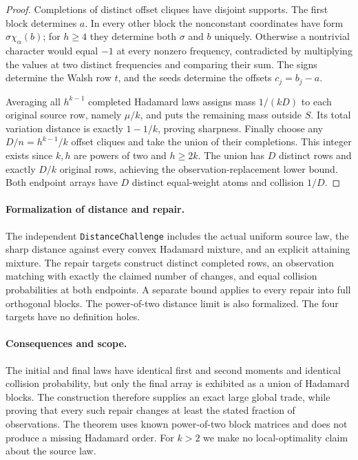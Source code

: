 \begin{proof}
Completions of distinct offset cliques have disjoint supports. The first
block determines $a$. In every other block the nonconstant coordinates
have form $\sigma\chi_\alpha(b)$; for $h\ge4$ they determine both
$\sigma$ and $b$ uniquely. Otherwise a nontrivial character would equal
$-1$ at every nonzero frequency, contradicted by multiplying the values
at two distinct frequencies and comparing their sum. The signs determine
the Walsh row $t$, and the seeds determine the offsets $c_j=b_j-a$.

Averaging all $h^{k-1}$ completed Hadamard laws assigns mass
$1/(kD)$ to each original source row, namely $\mu/k$, and puts the
remaining mass outside $S$. Its total variation distance is exactly
$1-1/k$, proving sharpness. Finally choose any
$D/n=h^{k-1}/k$ offset cliques and take the union of their completions.
This integer exists since $k,h$ are powers of two and $h\ge2k$.
The union has $D$ distinct rows and exactly $D/k$ original rows, achieving
the observation-replacement lower bound. Both endpoint arrays have
$D$ distinct equal-weight atoms and collision $1/D$.
\end{proof}

\paragraph{Formalization of distance and repair.}
The independent \texttt{DistanceChallenge} includes the actual uniform
source law, the sharp distance against every convex Hadamard mixture,
and an explicit attaining mixture. The repair targets construct distinct
completed rows, an observation matching with exactly the claimed number
of changes, and equal collision probabilities at both endpoints. A
separate bound applies to every repair into full orthogonal blocks.
The power-of-two distance limit is also formalized. The four targets
have no definition holes.

\paragraph{Consequences and scope.}
The initial and final laws have identical first and second moments and
identical collision probability, but only the final array is exhibited
as a union of Hadamard blocks. The construction therefore supplies an
exact large global trade, while proving that every such repair changes
at least the stated fraction of observations. The theorem uses known
power-of-two block matrices and does not produce a missing Hadamard
order. For $k>2$ we make no local-optimality claim about the source law.

